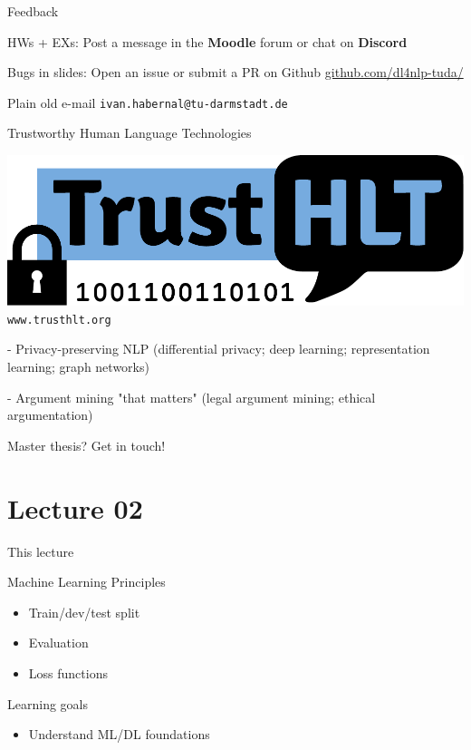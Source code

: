 \documentclass[12pt]{beamer}
\begin{document}
\begin{frame}{Feedback}

	HWs + EXs: Post a message in the \textbf{Moodle} forum or chat on \textbf{Discord}
	
	\bigskip
	
	Bugs in slides: Open an issue or submit a PR on Github \url{github.com/dl4nlp-tuda/}
	
	\bigskip
	
	Plain old e-mail \texttt{ivan.habernal@tu-darmstadt.de}
	
\end{frame}


\begin{frame}{Trustworthy Human Language Technologies}
	
	\includegraphics[height=.8cm]{img/logo-trusthlt.pdf} \hfill \texttt{www.trusthlt.org}
	
	\bigskip
	
	- Privacy-preserving NLP (differential privacy; deep learning; representation learning; graph networks)
	
	- Argument mining "that matters" (legal argument mining; ethical argumentation)
	
	\bigskip
	
	Master thesis? Get in touch!
	
\end{frame}

\section{Lecture 02}

\begin{frame}{This lecture}
	
Machine Learning Principles

\begin{itemize}
	\item Train/dev/test split
	\item Evaluation
	\item Loss functions
\end{itemize}

Learning goals

\begin{itemize}
	\item Understand ML/DL foundations
\end{itemize}

\end{frame}
\end{document}
